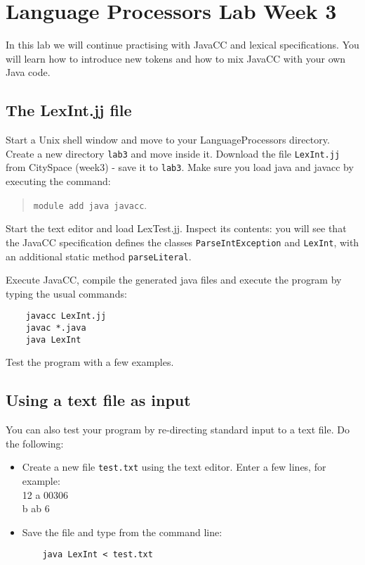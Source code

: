 \documentclass{article}
\begin{document}
\thispagestyle{empty}

\newcommand{\negra}[1]{\textbf{#1}}

\section*{Language Processors Lab Week 3 }

\medskip\noindent In this lab we will continue practising with JavaCC and lexical specifications. You will learn how to introduce new tokens and how to mix JavaCC with your own Java code.

\subsection*{The LexInt.jj file}

Start a Unix shell window and move to your LanguageProcessors directory. Create a new directory {\tt lab3} and move inside it. Download the file {\tt LexInt.jj} from CitySpace (week3) - save it to {\tt lab3}. Make sure you load java and javacc by executing the command:

\begin{quote}
{\tt module add java javacc}.
\end{quote}

Start the text editor and load LexTest.jj. Inspect its contents: you will see that the JavaCC specification defines the classes {\tt ParseIntException} and {\tt LexInt}, with an additional static method {\tt parseLiteral}.

Execute JavaCC, compile the generated java files and execute the program by typing the usual commands:

\begin{verbatim}
    javacc LexInt.jj
    javac *.java
    java LexInt
\end{verbatim}

Test the program with a few examples.

\subsection*{Using a text file as input}

You can also test your program by re-directing standard input to a text file. Do the following:
\begin{itemize}
\item Create a new file {\tt test.txt}  using the text editor. Enter a few lines, for example:\\
12 a 00306\\
b ab 6
\item Save the file and type from the command line:
\begin{verbatim}
    java LexInt < test.txt
\end{verbatim}
\end{itemize}
\end{document}
